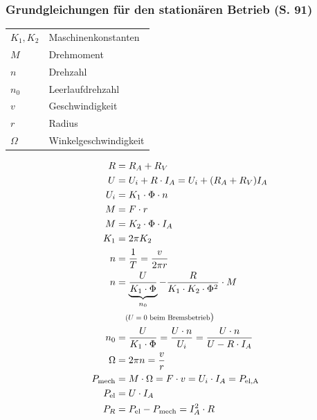 \documentclass[a4paper,twocolumn,10pt]{article}
\begin{document}
\subsubsection{Grundgleichungen für den stationären Betrieb (S. 91)}
\begin{tabular}{ll}
$K_1,K_2$ & Maschinenkonstanten\\
$M$ & Drehmoment\\
$n$ & Drehzahl\\
$n_0$ & Leerlaufdrehzahl\\
$v$ & Geschwindigkeit\\
$r$ & Radius\\
$\Omega$ & Winkelgeschwindigkeit
\end{tabular}
\begin{equation*}
\begin{split}
R&=R_A+R_V \\
U&=U_i+R\cdot I_A=U_i+(R_A+R_V)I_A\\
U_i&=K_1\cdot\Phi\cdot n\\
M&=F\cdot r\\
M&=K_2\cdot\Phi\cdot I_A\\
K_1&=2\pi K_2\\
n&=\frac{1}{T}=\frac{v}{2\pi r}\\
n&=\underbrace{\frac{U}{K_1\cdot \Phi}}_{n_0}-\frac{R}{K_1\cdot K_2\cdot\Phi^2}\cdot M\\
&\quad \scalebox{.75}{($U=0$ beim Bremsbetrieb})\\
n_0&=\frac{U}{K_1\cdot\Phi}=\frac{U\cdot n}{U_i}=\frac{U\cdot n}{U-R\cdot I_A}\\
\Omega&=2\pi n=\frac{v}{r}\\
P_{\text{mech}}&=M\cdot\Omega=F\cdot v=U_i\cdot I_A=P_{\text{el,A}}\\
P_{\text{el}}&=U\cdot I_A\\
P_R&=P_{\text{el}}-P_{\text{mech}}=I_A^2\cdot R\\
\end{split}
\end{equation*}
\end{document}
